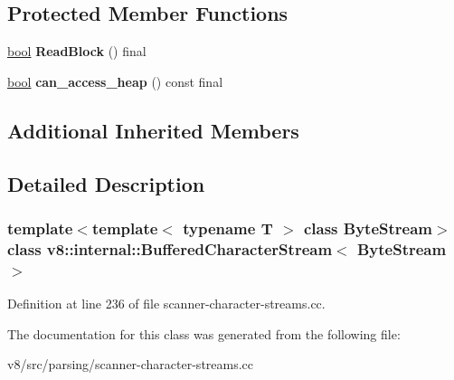 \subsection*{Protected Member Functions}
\begin{DoxyCompactItemize}
\item 
\mbox{\label{classv8_1_1internal_1_1BufferedCharacterStream_a50544f0208b9f17044bd14c879335fec}} 
\mbox{\hyperlink{classbool}{bool}} {\bfseries Read\+Block} () final
\item 
\mbox{\label{classv8_1_1internal_1_1BufferedCharacterStream_a68857c0fb52d4e2adcb22e09301542c9}} 
\mbox{\hyperlink{classbool}{bool}} {\bfseries can\+\_\+access\+\_\+heap} () const final
\end{DoxyCompactItemize}
\subsection*{Additional Inherited Members}


\subsection{Detailed Description}
\subsubsection*{template$<$template$<$ typename T $>$ class Byte\+Stream$>$\newline
class v8\+::internal\+::\+Buffered\+Character\+Stream$<$ Byte\+Stream $>$}



Definition at line 236 of file scanner-\/character-\/streams.\+cc.



The documentation for this class was generated from the following file\+:\begin{DoxyCompactItemize}
\item 
v8/src/parsing/scanner-\/character-\/streams.\+cc\end{DoxyCompactItemize}
